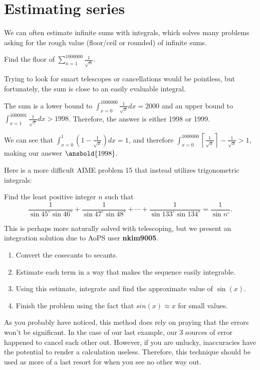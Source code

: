 \documentclass[mast]{lucky}
\begin{document}
\section{Estimating series}
We can often estimate infinite sums with integrals, which solves many problems asking for the rough value (floor/ceil or rounded) of infinite sums.
\begin{exam}
Find the floor of $\sum_{n=1}^{1000000}\frac{1}{\sqrt{n}}$.
\end{exam}
\begin{sol}
Trying to look for smart telescopes or cancellations would be pointless, but fortunately, the sum is close to an easily evaluable integral.

The sum is a lower bound to $\int_{x=0}^{1000000}\frac{1}{\sqrt{x}}dx=2000$ and an upper bound to $\int_{x=1}^{1000001}\frac{1}{\sqrt{x}}dx>1998$. Therefore, the answer is either 1998 or 1999. 

We can see that $\int_{x=0}^{1}(1-\frac{1}{\sqrt{x}})dx=1$, and therefore $\int_{x=0}^{1000000}\left\lceil\frac{1}{\sqrt{x}}\right\rceil-\frac{1}{\sqrt{x}}>1$, making our answer $\ansbold{1998}$.
\end{sol}
Here is a more difficult AIME problem 15 that instead utilizes trigonometric integrals:
\begin{exam}[AIME II 2000/15]
Find the least positive integer $n$ such that\[ \frac 1{\sin 45^\circ\sin 46^\circ}+\frac 1{\sin 47^\circ\sin 48^\circ}+\cdots+\frac 1{\sin 133^\circ\sin 134^\circ}=\frac 1{\sin n^\circ}. \]
\end{exam}
\begin{walk}
This is perhaps more naturally solved with telescoping, but we present an integration solution due to AoPS user \textbf{nkim9005}.
\begin{enumerate}
    \item Convert the cosecants to secants.
    \item Estimate each term in a way that makes the sequence easily integrable.
    \item Using this estimate, integrate and find the approximate value of $\sin(x)$.
    \item Finish the problem using the fact that $sin(x)\approx x$ for small values.
\end{enumerate}
\end{walk}
As you probably have noticed, this method does rely on praying that the errors won't be significant.
In the case of our last example, our 3 sources of error happened to cancel each other out.
However, if you are unlucky, inaccuracies have the potential to render a calculation useless.
Therefore, this technique should be used as more of a last resort for when you see no other way out.
\end{document}
